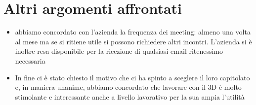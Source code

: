 \documentclass[12pt,a4paper]{article}
\begin{document}
\section{Altri argomenti affrontati}
\begin{itemize}
    \item abbiamo concordato con l'azienda la frequenza dei meeting: almeno una volta al mese ma se si ritiene utile si possono richiedere altri incontri. L'azienda si è inoltre resa disponibile per la ricezione di qualsiasi email ritenessimo necessaria
    \item In fine ci è stato chiesto il motivo che ci ha spinto a sceglere il loro capitolato e, in maniera unanime, abbiamo concordato che lavorare con il 3D è molto stimolante e interessante anche a livello lavorativo per la sua ampia l'utilità
\end{itemize} 
\end{document}
